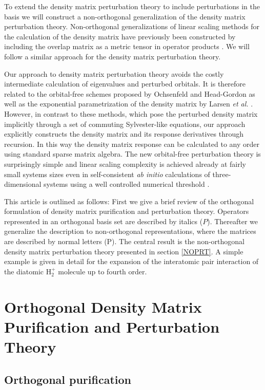 \documentclass[twocolumn,showpacs,preprintnumbers,amsmath,amssymb]{revtex4}
\begin{document}
To extend the density matrix perturbation theory to include perturbations in the basis
we will construct a non-orthogonal generalization of the density matrix perturbation theory.
Non-orthogonal generalizations of linear scaling methods for 
the calculation of the density matrix have previously been constructed by including the overlap 
matrix as a metric tensor in operator products \cite{Nunes94,White97,Palser98}.
We will follow a similar approach for the density matrix perturbation theory.

Our approach to density matrix perturbation theory avoids the costly intermediate calculation
of eigenvalues and perturbed orbitals. It is therefore related
to the orbital-free schemes proposed by Ochsenfeld and Head-Gordon \cite{Ochsenfeld97,Ochsenfeld04} as
well as the exponential parametrization of the density matrix by Larsen {\em et al.} \cite{Larsen01}.
However, in contrast to these methods, which pose the perturbed density matrix
implicitly through a set of commuting Sylvester-like equations, our approach explicitly constructs
the density matrix and its response derivatives through recursion. In this way the density matrix 
response can be calculated to any order using standard sparse matrix algebra.
The new orbital-free perturbation theory is surprisingly simple and linear scaling complexity is achieved
already at fairly small systems sizes even in self-consistent {\em ab initio} calculations of
three-dimensional systems using a well controlled numerical threshold \cite{WeberPRT2}.

This article is outlined as follows: First we give a brief review of the orthogonal 
formulation of density matrix purification and perturbation theory. 
Operators represented in an orthogonal basis set are described by italics ($P$). 
Thereafter we generalize the description to non-orthogonal representations, where 
the matrices are described by normal letters (P). The central result is the non-orthogonal
density matrix perturbation theory presented in section \ref{NOPRT}.
A simple example is given in detail for the expansion of the interatomic pair 
interaction of the diatomic H$_2^+$ molecule up to fourth order.


\section{Orthogonal Density Matrix Purification and Perturbation Theory}

\subsection{Orthogonal purification}
\end{document}
